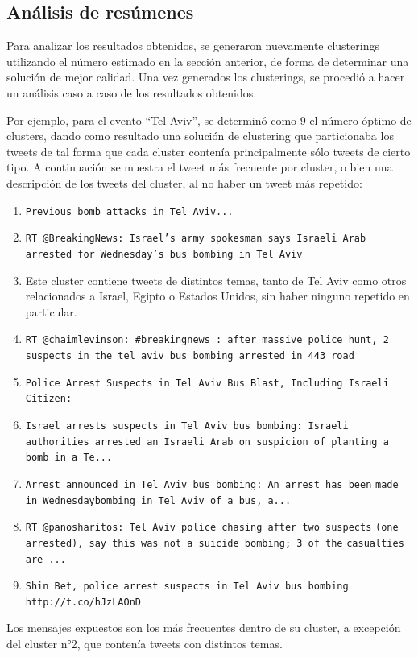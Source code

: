 \subsection{Análisis de resúmenes}
\label{sec-4.4.3}


    Para analizar los resultados obtenidos, se generaron nuevamente
    clusterings utilizando el número estimado en la sección anterior, de
    forma de determinar una solución de mejor calidad. Una vez generados 
    los clusterings, se procedió a hacer un análisis
    caso a caso de los resultados obtenidos.

    Por ejemplo, para el evento ``Tel Aviv'', se determinó como $9$ el
    número óptimo de clusters, dando como resultado una solución de
    clustering que particionaba los tweets de tal forma que cada
    cluster contenía principalmente sólo tweets de cierto tipo. A continuación 
    se muestra el tweet más frecuente por cluster, o bien una descripción de los tweets
    del cluster, al no haber un tweet más repetido:

\begin{enumerate}
\item \texttt{Previous bomb attacks in Tel Aviv...}
\item \texttt{RT @BreakingNews: Israel's army spokesman says Israeli Arab        arrested for Wednesday's bus bombing in Tel Aviv}
\item Este cluster contiene tweets de distintos temas, tanto de Tel Aviv como
       otros relacionados a Israel, Egipto o Estados Unidos, sin haber ninguno repetido en particular.
\item \texttt{RT @chaimlevinson: \#breakingnews : after massive  police hunt,        2  suspects in the tel aviv bus bombing arrested in 443 road}
\item \texttt{Police Arrest Suspects in Tel Aviv Bus Blast, Including        Israeli Citizen:}
\item \texttt{Israel arrests suspects in Tel Aviv bus bombing: Israeli}
       \texttt{authorities arrested an Israeli Arab on suspicion of planting a}
       \texttt{bomb in a Te...}
\item \texttt{Arrest announced in Tel Aviv bus bombing: An arrest has been}
       \texttt{made in Wednesdaybombing in Tel Aviv of a bus, a...}
\item \texttt{RT @panosharitos: Tel Aviv police chasing after two suspects}
       \texttt{(one arrested), say this was not a suicide bombing; 3 of the}
       \texttt{casualties are ...}
\item \texttt{Shin Bet, police arrest suspects in Tel Aviv bus bombing}
       \texttt{http://t.co/hJzLAOnD}
\end{enumerate}
    Los mensajes expuestos son los más frecuentes dentro de su
    cluster, a excepción del cluster n°2, que contenía tweets con
    distintos temas.

